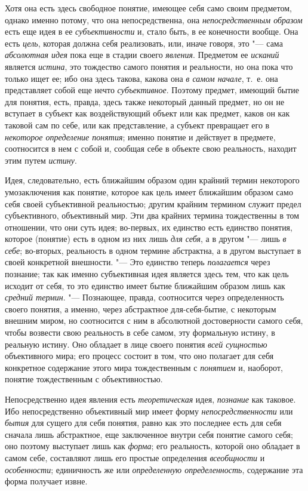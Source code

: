 {{Хотя она есть здесь свободное понятие, имеющее себя само своим
предметом, однако именно потому, что она непосредственна, она
{\em непосредственным образом}
есть еще идея в ее
{\em субъективности} и,
стало быть, в ее конечности вообще. Она есть
{\em цель}, которая
должна себя реализовать, или, иначе говоря, это "--- сама
{\em абсолютная идея}
пока еще в стадии своего
{\em явления}. Предметом
ее {\em исканий} является
{\em истина}, это
тождество самого понятия и реальности, но она пока что только ищет ее; ибо
она здесь такова, какова она {\em в
самом начале}, т.~е. она представляет собой еще нечто
{\em субъективное}.
Поэтому предмет, имеющий бытие для понятия, есть, правда,
здесь также некоторый данный предмет, но он не вступает в субъект как
воздействующий объект или как предмет, каков он как таковой сам по себе,
или как представление, а субъект превращает его в
{\em некоторое определение понятия};
именно понятие и действует в предмете, соотносится в нем с
собой и, сообщая себе в объекте свою реальность, находит этим путем
{\em истину}.

Идея, следовательно, есть ближайшим образом один крайний
термин некоторого умозаключения как понятие, которое как цель имеет
ближайшим образом само себя своей субъективной реальностью; другим крайним
термином служит предел субъективного, объективный мир. Эти два крайних
термина тождественны в том отношении, что они суть идея; во-первых, их
единство есть единство понятия, которое (понятие) есть в одном из них лишь
{\em для себя}, а в
другом "--- лишь {\em в
себе}; во-вторых, реальность в одном термине абстрактна, а в
другом выступает в своей конкретной внешности. "--- Это
единство теперь {\em полагается}
через познание; так как именно субъективная идея является
здесь тем, что как цель исходит от себя, то это единство имеет бытие
ближайшим образом лишь как {\em средний
термин}. "--- Познающее, правда, соотносится через
определенность своего понятия, а именно, через абстрактное
для-себя-бытие, с некоторым внешним миром, но соотносится с
ним в абсолютной достоверности самого себя, чтобы возвести свою реальность
в себе самом, эту формальную истину, в реальную истину. Оно обладает в лице
своего понятия {\em всей сущностью}
объективного мира; его процесс состоит в том, что оно
полагает для себя конкретное содержание этого мира тождественным с
{\em понятием} и,
наоборот, понятие тождественным с объективностью.

Непосредственно идея явления есть
{\em теоретическая} идея,
{\em познание} как
таковое. Ибо непосредственно объективный мир имеет форму
{\em непосредственности}
или {\em бытия}
для сущего для себя понятия, равно как это последнее есть для
себя сначала лишь абстрактное, еще заключенное внутри себя понятие самого
себя; оно поэтому выступает лишь как
{\em форма}; его
реальность, которой оно обладает в самом себе, составляют лишь его простые
определения {\em всеобщности}
и {\em особенности};
единичность же или
{\em определенную определенность},
содержание эта форма получает извне.

}}
